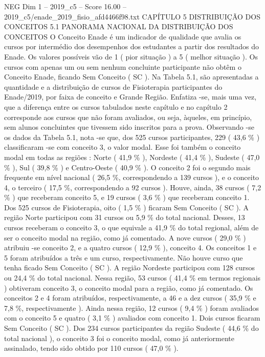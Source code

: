 \begin{textsample}{NEG Dim 1 – 2019\_c5 – Score 16.00 – 2019\_c5/enade\_2019\_fisio\_afd4466f98.txt}  \label{ex:f1_neg_400}
CAPÍTULO 5 DISTRIBUIÇÃO DOS CONCEITOS 5.1 PANORAMA NACIONAL DA DISTRIBUIÇÃO DOS CONCEITOS O Conceito Enade é um indicador de qualidade que avalia os cursos por intermédio dos desempenhos dos estudantes a partir dos resultados do Enade.
Os valores possíveis vão de 1 ( pior situação ) a 5 ( melhor situação ).
Os cursos com apenas um ou sem nenhum concluinte participante não obtêm o Conceito Enade, ficando Sem Conceito ( SC ).
Na Tabela 5.1, são apresentadas a quantidade e a distribuição de cursos de Fisioterapia participantes do Enade/2019, por faixa de conceito e Grande Região.
Enfatiza -se, mais uma vez, que a diferença entre os cursos tabulados neste capítulo e no capítulo 2 corresponde aos cursos que não foram avaliados, ou seja, àqueles, em princípio, sem alunos concluintes que tivessem sido inscritos para a prova.
Observando -se os dados da Tabela 5.1, nota -se que, dos 525 cursos participantes, 229 ( 43,6 \% ) classificaram -se com conceito 3, o valor modal.
Esse foi também o conceito modal em todas as regiões : Norte ( 41,9 \% ), Nordeste ( 41,4 \% ), Sudeste ( 47,0 \% ), Sul ( 39,8 \% ) e Centro-Oeste ( 40,9 \% ).
O conceito 2 foi o segundo mais frequente em nível nacional ( 26,5 \%, correspondendo a 139 cursos ), e o conceito 4, o terceiro ( 17,5 \%, correspondendo a 92 cursos ).
Houve, ainda, 38 cursos ( 7,2 \% ) que receberam conceito 5, e 19 cursos ( 3,6 \% ) que receberam conceito 1.
Dos 525 cursos de Fisioterapia, oito ( 1,5 \% ) ficaram Sem Conceito ( SC ).
A região Norte participou com 31 cursos ou 5,9 \% do total nacional.
Desses, 13 cursos receberam o conceito 3, o que equivale a 41,9 \% do total regional, além de ser o conceito modal na região, como já comentado.
A nove cursos ( 29,0 \% ) atribuiu -se conceito 2, e a quatro cursos ( 12,9 \% ), conceito 4.
Os conceitos 1 e 5 foram atribuídos a três e um curso, respectivamente.
Não houve curso que tenha ficado Sem Conceito ( SC ).
A região Nordeste participou com 128 cursos ou 24,4 \% do total nacional.
Nessa região, 53 cursos ( 41,4 \% em termos regionais ) obtiveram conceito 3, o conceito modal para a região, como já comentado.
Os conceitos 2 e 4 foram atribuídos, respectivamente, a 46 e a dez cursos ( 35,9 \% e 7,8 \%, respectivamente ).
Ainda nessa região, 12 cursos ( 9,4 \% ) foram avaliados com o conceito 5 e quatro ( 3,1 \% ) avaliados com conceito 1.
Dois cursos ficaram Sem Conceito ( SC ).
Dos 234 cursos participantes da região Sudeste ( 44,6 \% do total nacional ), o conceito 3 foi o conceito modal, como já anteriormente assinalado, tendo sido obtido por 110 cursos ( 47,0 \% ).

\end{textsample}
